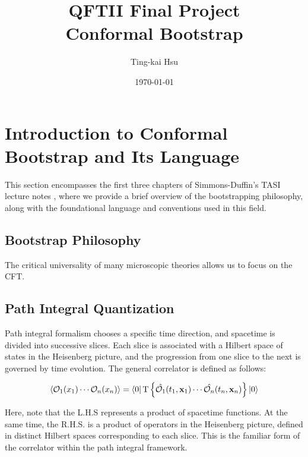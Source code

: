 \documentclass[12pt]{article}
\title{QFTII Final Project\\Conformal Bootstrap}
\author{Ting-kai Hsu}
\date{\today}
\numberwithin{equation}{section}
\newcommand\<\langle
\renewcommand\>\rangle
\renewcommand\.{\cdot}
\begin{document}
\maketitle
\tableofcontents
\begin{abstract}
    
\end{abstract}
\section{Introduction to Conformal Bootstrap and Its Language}

This section encompasses the first three chapters of Simmons-Duffin's TASI lecture notes \cite{simmonsduffin2016tasilecturesconformalbootstrap}, where we provide a brief overview of the bootstrapping philosophy, along with the foundational language and conventions used in this field.

\subsection{Bootstrap Philosophy}
The critical universality of many microscopic theories allows us to focus on the CFT.

\subsection{Path Integral Quantization}
Path integral formalism chooses a specific time direction, and spacetime is divided into successive slices. Each slice is associated with a Hilbert space of states in the Heisenberg picture, and the progression from one slice to the next is governed by time evolution. The general correlator is defined as follows:

\begin{equation}
    \langle\mathcal{O}_1(x_1)\cdots\mathcal{O}_n(x_n)\rangle = \bra{0}\text{T}\left\{\hat{\mathcal{O}_1}(t_1,\mathbf{x}_1)\cdots\hat{\mathcal{O}_n}(t_n,\mathbf{x}_n)\right\}\ket{0}
\end{equation}

Here, note that the L.H.S represents a product of spacetime functions. At the same time, the R.H.S. is a product of operators in the Heisenberg picture, defined in distinct Hilbert spaces corresponding to each slice. This is the familiar form of the correlator within the path integral framework.
\end{document}
